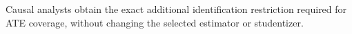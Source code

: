 Causal analysts obtain the exact additional identification restriction required for ATE coverage, without changing the selected estimator or studentizer.